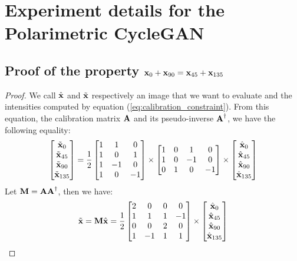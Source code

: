 \chapter{Experiment details for the Polarimetric CycleGAN}
\label{chap:details_eccv}

\section{Proof of the property $\textbf{x}_0 + \textbf{x}_{90} = \textbf{x}_{45} + \textbf{x}_{135}$}
\label{app:physical_prop}

\begin{proof}
	We call $\hat{\textbf{x}}$ and $\tilde{\textbf{x}}$ respectively an image that we want to evaluate and the intensities computed by equation (\ref{eq:calibration_constraint}). From this equation, the calibration matrix $\ma$ and its pseudo-inverse $\ma^\dagger$, we have the following equality:
	$$\begin{bmatrix} 
		\tilde{\textbf{x}}_0 \\
		\tilde{\textbf{x}}_{45} \\
		\tilde{\textbf{x}}_{90} \\
		\tilde{\textbf{x}}_{135} 
	\end{bmatrix} = \frac{1}{2}\begin{bmatrix}
		1 & 1 & 0 \\
		1 & 0 & 1 \\
		1 & -1 & 0 \\
		1 & 0 & -1
	\end{bmatrix}
	\times \begin{bmatrix}
		1 & 0 & 1 & 0 \\
		1 & 0 & -1 & 0 \\
		0 & 1 & 0 & -1
	\end{bmatrix} \times \begin{bmatrix} 
		\hat{\textbf{x}}_0 \\
		\hat{\textbf{x}}_{45} \\
		\hat{\textbf{x}}_{90} \\
		\hat{\textbf{x}}_{135}
	\end{bmatrix}
	$$
	Let $\mm = \ma\ma^\dagger$, then we have:
	$$
	\tilde{\vx} = \mm\hat{\vx} = \frac{1}{2}\begin{bmatrix}
		2 & 0 & 0 & 0 \\
		1 & 1 & 1 & -1 \\
		0 & 0 & 2 & 0 \\
		1 & -1 & 1 & 1
	\end{bmatrix} \times \begin{bmatrix} 
		\hat{\vx}_0 \\
		\hat{\vx}_{45} \\
		\hat{\vx}_{90} \\
		\hat{\vx}_{135}
	\end{bmatrix}
	$$
	

\end{proof}
